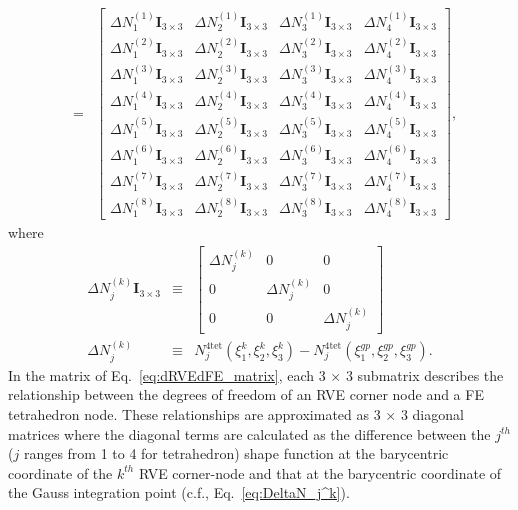 \documentclass[12pt,aps,pre]{revtex4}
\begin{document}
\begin{eqnarray}
%
&=&\begin{bmatrix}
\Delta N_1^{(1)} \pmb{I}_{3\times3} & \Delta N_2^{(1)}\pmb{I}_{3\times3} & \Delta N_3^{(1)} \pmb{I}_{3\times3} & \Delta N_4^{(1)}\pmb{I}_{3\times3} \\
%
\Delta N_1^{(2)} \pmb{I}_{3\times3} & \Delta N_2^{(2)}\pmb{I}_{3\times3} & \Delta N_3^{(2)} \pmb{I}_{3\times3} & \Delta N_4^{(2)}\pmb{I}_{3\times3} \\
%
\Delta N_1^{(3)} \pmb{I}_{3\times3} & \Delta N_2^{(3)}\pmb{I}_{3\times3} & \Delta N_3^{(3)} \pmb{I}_{3\times3} & \Delta N_4^{(3)}\pmb{I}_{3\times3} \\
%
\Delta N_1^{(4)} \pmb{I}_{3\times3} & \Delta N_2^{(4)}\pmb{I}_{3\times3} & \Delta N_3^{(4)} \pmb{I}_{3\times3} & \Delta N_4^{(4)}\pmb{I}_{3\times3} \\
%
\Delta N_1^{(5)} \pmb{I}_{3\times3} & \Delta N_2^{(5)}\pmb{I}_{3\times3} & \Delta N_3^{(5)} \pmb{I}_{3\times3} & \Delta N_4^{(5)}\pmb{I}_{3\times3} \\
%
\Delta N_1^{(6)} \pmb{I}_{3\times3} & \Delta N_2^{(6)}\pmb{I}_{3\times3} & \Delta N_3^{(6)} \pmb{I}_{3\times3} & \Delta N_4^{(6)}\pmb{I}_{3\times3} \\
%
\Delta N_1^{(7)} \pmb{I}_{3\times3} & \Delta N_2^{(7)}\pmb{I}_{3\times3} & \Delta N_3^{(7)} \pmb{I}_{3\times3} & \Delta N_4^{(7)}\pmb{I}_{3\times3} \\
%
\Delta N_1^{(8)} \pmb{I}_{3\times3} & \Delta N_2^{(8)}\pmb{I}_{3\times3} & \Delta N_3^{(8)} \pmb{I}_{3\times3} & \Delta N_4^{(8)}\pmb{I}_{3\times3} 
\end{bmatrix},
\label{eq:dRVEdFE_matrix}
\end{eqnarray}
%
where
%
\begin{eqnarray}
\Delta N_j^{(k)} \pmb{I}_{3\times3} &\equiv&
\begin{bmatrix}
\Delta N_j^{(k)} & 0 & 0 \\
0 & \Delta N_j^{(k)} & 0 \\
0 & 0 & \Delta N_j^{(k)} 
\end{bmatrix} \nonumber\\
%
\Delta N_j^{(k)} &\equiv& N_j^{4\text{tet}}(\xi_1^k,\xi_2^k,\xi_3^k) - N_j^{4\text{tet}}(\xi_1^{gp},\xi_2^{gp},\xi_3^{gp}) .
\label{eq:DeltaN_j^k}
\end{eqnarray}
%
In the matrix of Eq.\ \eqref{eq:dRVEdFE_matrix}, each 3 $\times$ 3 submatrix describes the relationship between the degrees of freedom of an RVE corner node and a FE tetrahedron node. These relationships are approximated as 3 $\times$ 3 diagonal matrices where the diagonal terms are calculated as the difference between the $j^{th}$ ($j$ ranges from 1 to 4 for tetrahedron) shape function at the barycentric coordinate of the $k^{th}$ RVE corner-node and that at the barycentric coordinate of the Gauss integration point (c.f., Eq.\ \eqref{eq:DeltaN_j^k}). 



\end{document}

